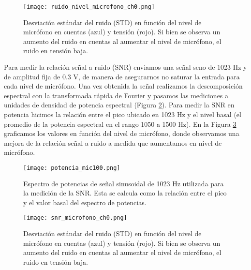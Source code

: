 \documentclass[a4paper, 11pt]{article}
\begin{document}
\begin{figure} [H]
\centering
\texttt{[image: ruido\_nivel\_microfono\_ch0.png]}
\caption{Desviación estándar del ruido (STD) en función del nivel de micrófono en cuentas (azul) y tensión (rojo). Si bien se observa un aumento del ruido en cuentas al aumentar el nivel de micrófono, el ruido en tensión baja. \label{fig:ruidomic}}
\end{figure} 

Para medir la relación señal a ruido (SNR) enviamos una señal seno de 1023 Hz y de amplitud fija de 0.3 V, de manera de asegurarnos no saturar la entrada para cada nivel de micrófono. Una vez obtenida la señal realizamos la descomposición espectral con la transformada rápida de Fourier y pasamos las mediciones a unidades de densidad de potencia espectral (Figura \ref{fig:potencia_mic100}). Para medir la SNR en potencia hicimos la relación entre el pico ubicado en 1023 Hz y el nivel basal (el promedio de la potencia espectral en el rango 1050 a 1500 Hz). En la Figura \ref{fig:snr} graficamos los valores en función del nivel de micrófono, donde observamos una mejora de la relación señal a ruido a medida que aumentamos en nivel de micrófono.

\begin{figure} [H]
\centering
\texttt{[image: potencia\_mic100.png]}
\caption{Espectro de potencias de señal sinusoidal de 1023 Hz utilizada para la medición de la SNR. Esta se calcula como la relación entre el pico y el valor basal del espectro de potencias. \label{fig:potencia_mic100}}
\end{figure} 

\begin{figure} [H]
\centering
\texttt{[image: snr\_microfono\_ch0.png]}
\caption{Desviación estándar del ruido (STD) en función del nivel de micrófono en cuentas (azul) y tensión (rojo). Si bien se observa un aumento del ruido en cuentas al aumentar el nivel de micrófono, el ruido en tensión baja. \label{fig:snr}}
\end{figure} 
\end{document}
